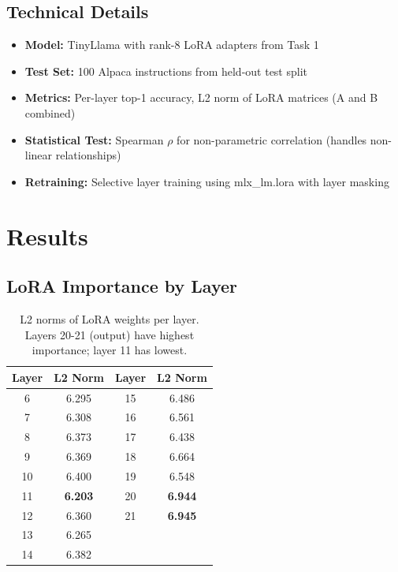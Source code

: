 \documentclass[11pt,a4paper]{article}
\begin{document}
\subsection*{Technical Details}
\begin{itemize}
    \item \textbf{Model:} TinyLlama with rank-8 LoRA adapters from Task 1
    \item \textbf{Test Set:} 100 Alpaca instructions from held-out test split
    \item \textbf{Metrics:} Per-layer top-1 accuracy, L2 norm of LoRA matrices (A and B combined)
    \item \textbf{Statistical Test:} Spearman $\rho$ for non-parametric correlation (handles non-linear relationships)
    \item \textbf{Retraining:} Selective layer training using mlx\_lm.lora with layer masking
\end{itemize}

\section*{Results}

\subsection*{LoRA Importance by Layer}
\begin{table}[H]
\centering
\small
\begin{tabular}{@{}cc|cc@{}}
\toprule
\textbf{Layer} & \textbf{L2 Norm} & \textbf{Layer} & \textbf{L2 Norm} \\
\midrule
6  & 6.295 & 15 & 6.486 \\
7  & 6.308 & 16 & 6.561 \\
8  & 6.373 & 17 & 6.438 \\
9  & 6.369 & 18 & 6.664 \\
10 & 6.400 & 19 & 6.548 \\
11 & \textbf{6.203} & 20 & \textbf{6.944} \\
12 & 6.360 & 21 & \textbf{6.945} \\
13 & 6.265 & \multicolumn{2}{c}{} \\
14 & 6.382 & \multicolumn{2}{c}{} \\
\bottomrule
\end{tabular}
\caption{L2 norms of LoRA weights per layer. Layers 20-21 (output) have highest importance; layer 11 has lowest.}
\end{table}
\end{document}
